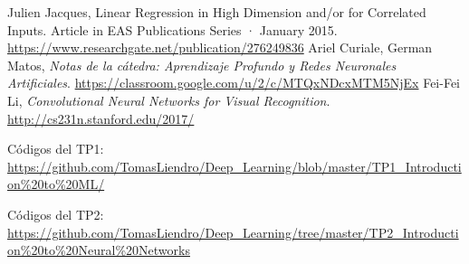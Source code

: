 
\begin{thebibliography}{9}
Julien Jacques, Linear Regression in High Dimension and/or for Correlated Inputs. Article in EAS Publications Series · January 2015. \url{https://www.researchgate.net/publication/276249836}
Ariel Curiale, German Matos, \textit{Notas de la cátedra: Aprendizaje Profundo y Redes Neuronales Artificiales}.
\url{https://classroom.google.com/u/2/c/MTQxNDcxMTM5NjEx}
Fei-Fei Li, \textit{Convolutional Neural Networks for Visual Recognition}.
\url{http://cs231n.stanford.edu/2017/}


Códigos del TP1: \url{https://github.com/TomasLiendro/Deep_Learning/blob/master/TP1_Introduction\%20to\%20ML/}



Códigos del TP2: \url{https://github.com/TomasLiendro/Deep_Learning/tree/master/TP2_Introduction%20to%20Neural%20Networks}
\end{thebibliography}
% 